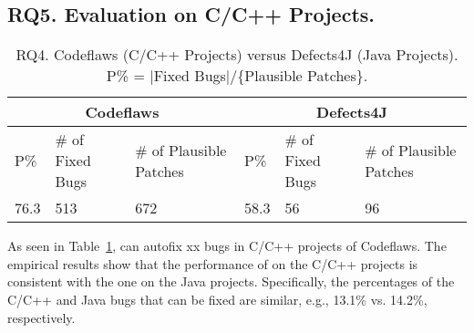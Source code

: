 \subsection{\bf RQ5. Evaluation on C/C++ Projects.}




\begin{table}[t]
	\caption{RQ4. Codeflaws (C/C++ Projects) versus Defects4J (Java Projects). P\% = $|$Fixed Bugs$|$/\{Plausible Patches\}.}
	\vspace{-5pt}
	{\small
		\begin{center}
			\tabcolsep 2.7pt
			\begin{tabular}{p{0.3cm}<{\centering}|p{1.5cm}<{\centering}|p{1.55cm}<{\centering}|p{0.3cm}<{\centering}|p{1.5cm}<{\centering}|p{1.55cm}<{\centering}}\hline	
				
				\multicolumn{3}{c|}{Codeflaws } & \multicolumn{3}{c}{Defects4J}\\\hline
				 P\%& \# of Fixed Bugs& \# of Plausible Patches &P\%& \# of Fixed Bugs & \# of Plausible Patches \\ \hline
				
				  76.3  &        513       &            672             &  58.3 &          56        &        96                 \\ 
				\hline

			\end{tabular}
			\label{RQ5}
		\end{center}
	}
	\vspace{-10pt}
\end{table}


As seen in Table~\ref{RQ5}, {\tool} can autofix xx bugs in C/C++ projects of Codeflaws. 
The empirical results show that the performance of
{\tool} on the C/C++ projects is consistent with the one on the Java
projects. Specifically, the percentages of the C/C++ and Java bugs that can be fixed are similar, e.g., 13.1\% vs. 14.2\%, respectively. 
